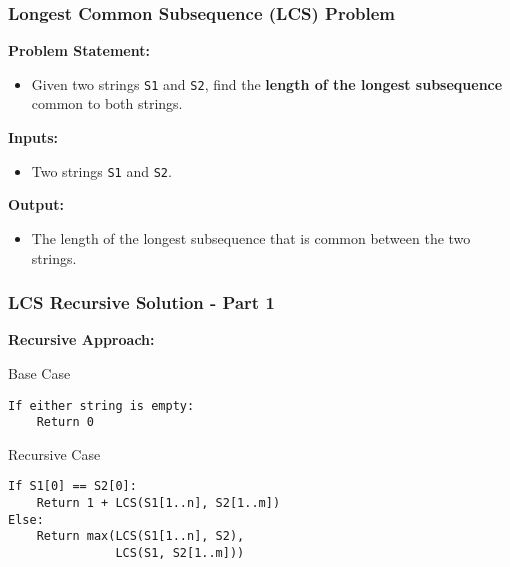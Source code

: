 \documentclass[10pt,aspectratio=43]{beamer}
\begin{document}
\begin{frame}
    \frametitle{Longest Common Subsequence (LCS) Problem}
    
    \textbf{Problem Statement:}
    \begin{itemize}
        \item Given two strings \texttt{S1} and \texttt{S2}, find the \textbf{length of the longest subsequence} common to both strings.
    \end{itemize}

    \vspace{0.3cm}
    \textbf{Inputs:}
    \begin{itemize}
        \item Two strings \texttt{S1} and \texttt{S2}.
    \end{itemize}
    
    \vspace{0.3cm}
    \textbf{Output:}
    \begin{itemize}
        \item The length of the longest subsequence that is common between the two strings.
    \end{itemize}

\end{frame}

\begin{frame}[fragile]
    \frametitle{LCS Recursive Solution - Part 1}

    \textbf{Recursive Approach:}

    \begin{block}{Base Case}
    \begin{verbatim}
If either string is empty:
    Return 0
    \end{verbatim}
    \end{block}
    
    \begin{block}{Recursive Case}
    \begin{verbatim}
If S1[0] == S2[0]:
    Return 1 + LCS(S1[1..n], S2[1..m])
Else:
    Return max(LCS(S1[1..n], S2), 
               LCS(S1, S2[1..m]))
    \end{verbatim}
    \end{block}
\end{frame}
\end{document}
